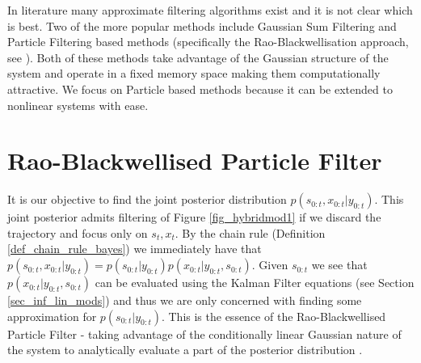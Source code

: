 In literature many approximate filtering algorithms exist and it is not clear which is best. Two of the more popular methods include Gaussian Sum Filtering \cite{barber2} and Particle Filtering based methods (specifically the Rao-Blackwellisation approach, see \cite{chen}\cite{doucet}). Both of these methods take advantage of the Gaussian structure of the system and operate in a fixed memory space making them computationally attractive. We focus on Particle based methods because it can be extended to nonlinear systems with ease.   

\section{Rao-Blackwellised Particle Filter}
It is our objective to find the joint posterior distribution $p(s_{0:t}, x_{0:t}|y_{0:t})$. This joint posterior admits filtering of Figure \ref{fig_hybridmod1} if we discard the trajectory and focus only on $s_t,x_t$. By the chain rule (Definition \ref{def_chain_rule_bayes}) we immediately have that $p(s_{0:t}, x_{0:t}|y_{0:t}) = p(s_{0:t}|y_{0:t})p(x_{0:t}|y_{0:t}, s_{0:t})$. Given $s_{0:t}$ we see that $p(x_{0:t}|y_{0:t}, s_{0:t})$ can be evaluated using the Kalman Filter equations (see Section \ref{sec_inf_lin_mods}) and thus we are only concerned with finding some approximation for $p(s_{0:t}|y_{0:t})$. This is the essence of the Rao-Blackwellised Particle Filter - taking advantage of the conditionally linear Gaussian nature of the system to analytically evaluate a part of the posterior distribution \cite{doucet}.

